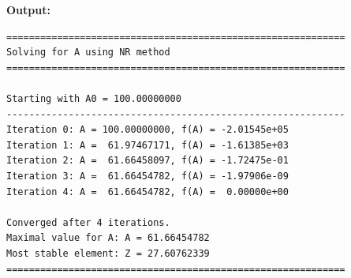 {\noindent \large \textbf{Output:}}
\begin{verbatim}
============================================================
Solving for A using NR method
============================================================

Starting with A0 = 100.00000000
------------------------------------------------------------
Iteration 0: A = 100.00000000, f(A) = -2.01545e+05
Iteration 1: A =  61.97467171, f(A) = -1.61385e+03
Iteration 2: A =  61.66458097, f(A) = -1.72475e-01
Iteration 3: A =  61.66454782, f(A) = -1.97906e-09
Iteration 4: A =  61.66454782, f(A) =  0.00000e+00

Converged after 4 iterations.
Maximal value for A: A = 61.66454782
Most stable element: Z = 27.60762339
============================================================
\end{verbatim}
